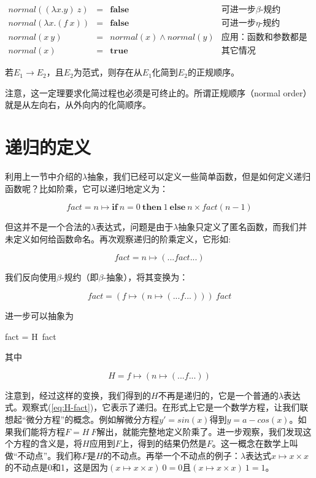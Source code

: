 \documentclass{article}
\begin{document}
\[
\begin{array}{rcll}
normal((\lambda x . y)\ z) & = & \textbf{false} & \text{可进一步$\beta$-规约} \\
normal(\lambda x . (f\ x)) & = & \textbf{false} & \text{可进一步$\eta$-规约} \\
normal(x\ y) & = & normal(x) \land normal(y) & \text{应用：函数和参数都是范式} \\
normal(x) & = & \textbf{true} & \text{其它情况}
\end{array}
\]

\begin{theorem}[丘奇-罗瑟定理二]
若$E_1 \to E_2$，且$E_2$为范式，则存在从$E_1$化简到$E_2$的正规顺序。
\end{theorem}

注意，这一定理要求化简过程也必须是可终止的。所谓正规顺序（normal order）就是从左向右，从外向内的化简顺序。

\section{递归的定义}

利用上一节中介绍的$\lambda$抽象，我们已经可以定义一些简单函数，但是如何定义递归函数呢？比如阶乘，它可以递归地定义为：

\[
fact = n \mapsto \textbf{if}\ n = 0\ \textbf{then}\ 1\ \textbf{else}\ n \times fact (n - 1)
\]

但这并不是一个合法的$\lambda$表达式，问题是由于$\lambda$抽象只定义了匿名函数，而我们并未定义如何给函数命名。再次观察递归的阶乘定义，它形如:

\[
fact = n \mapsto (... fact ...)
\]

我们反向使用$\beta$-规约（即$\beta$-抽象），将其变换为：

\[
fact = (f \mapsto (n \mapsto (... f ...)))\ fact
\]

进一步可以抽象为

\be
fact = H\ fact
\label{eq:H-fact}
\ee

其中

\[
H = f \mapsto (n \mapsto (... f ...))
\]

注意到，经过这样的变换，我们得到的$H$不再是递归的，它是一个普通的$\lambda$表达式。观察式(\ref{eq:H-fact})，它表示了递归。在形式上它是一个数学方程，让我们联想起“微分方程”的概念。例如解微分方程$y' = sin(x)$得到$y = a - cos(x)$。如果我们能将方程$F = H\ F$解出，就能完整地定义阶乘了。进一步观察，我们发现这个方程的含义是，将$H$应用到$F$上，得到的结果仍然是$F$。这一概念在数学上叫做“不动点”。我们称$F$是$H$的不动点。再举一个不动点的例子：$\lambda$表达式$x \mapsto x \times x$的不动点是0和1，这是因为$(x \mapsto x \times x)\ 0 = 0$且$(x \mapsto x \times x)\ 1 = 1$。
\end{document}

